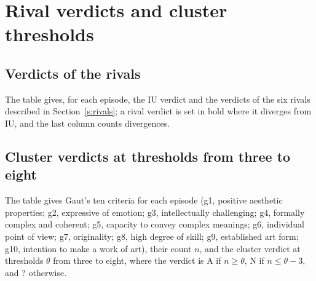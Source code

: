 \documentclass{situationist-preprint}
\begin{document}


\section{Rival verdicts and cluster thresholds}\label{app:rivals}

\subsection{Verdicts of the rivals}\label{tab:rivals}

The table gives, for each episode, the IU verdict and the verdicts of the six rivals described in Section~\ref{s:rivals}; a rival verdict is set in bold where it diverges from IU, and the last column counts divergences.



\subsection{Cluster verdicts at thresholds from three to eight}\label{tab:thresholds}

The table gives Gaut's ten criteria for each episode (g1, positive aesthetic properties; g2, expressive of emotion; g3, intellectually challenging; g4, formally complex and coherent; g5, capacity to convey complex meanings; g6, individual point of view; g7, originality; g8, high degree of skill; g9, established art form; g10, intention to make a work of art), their count $n$, and the cluster verdict at thresholds $\theta$ from three to eight, where the verdict is A if $n \geq \theta$, N if $n \leq \theta - 3$, and ? otherwise.


\end{document}
